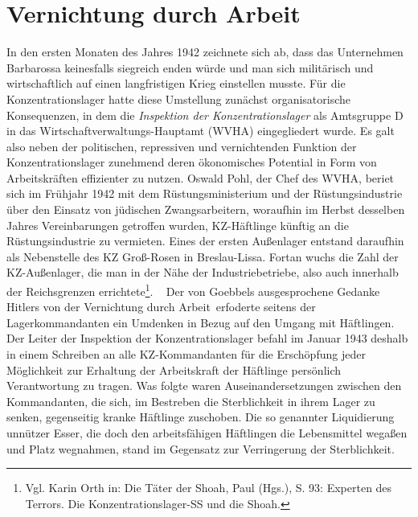 \documentclass[a4paper,12pt,ngerman,
]{nisebook}
\begin{document}
\section{Vernichtung durch Arbeit}
In den ersten Monaten des Jahres 1942 zeichnete sich ab, dass das Unternehmen Barbarossa keinesfalls siegreich enden würde und man sich militärisch und wirtschaftlich auf einen langfristigen Krieg einstellen musste. Für die Konzentrationslager hatte diese Umstellung zunächst organisatorische Konsequenzen, in dem die \emph{Inspektion der Konzentrationslager} als Amtsgruppe D in das Wirtschaftverwaltungs-Hauptamt (WVHA) eingegliedert wurde. Es galt also neben der politischen, repressiven und vernichtenden Funktion der Konzentrationslager zunehmend deren ökonomisches Potential in Form von Arbeitskräften effizienter zu nutzen.
Oswald Pohl, der Chef des WVHA, beriet sich im Frühjahr 1942 mit dem Rüstungsministerium und der Rüstungsindustrie über den Einsatz von jüdischen Zwangsarbeitern, woraufhin im Herbst desselben Jahres Vereinbarungen getroffen wurden, KZ-Häftlinge künftig an die Rüstungsindustrie zu vermieten. Eines der ersten Außenlager  entstand daraufhin als Nebenstelle des KZ Groß-Rosen in Breslau-Lissa. Fortan wuchs die Zahl der KZ-Außenlager, die man in der Nähe der Industriebetriebe, also auch innerhalb der Reichsgrenzen errichtete\footnote{Vgl. Karin Orth in: \glqq Die Täter der Shoah\grqq, Paul (Hgs.), S. 93: \glqq Experten des Terrors. Die Konzentrationslager-SS und die Shoah\grqq.}.
~\newline
Der von Goebbels ausgesprochene Gedanke Hitlers von der \glqq Vernichtung durch Arbeit\grqq~erfoderte seitens der Lagerkommandanten ein Umdenken in Bezug auf den Umgang mit Häftlingen.
Der Leiter der Inspektion der Konzentrationslager befahl im Januar 1943 deshalb in einem Schreiben an alle KZ-Kommandanten \glqq für die Erschöpfung jeder Möglichkeit zur Erhaltung der Arbeitskraft der Häftlinge persönlich Verantwortung zu tragen\grqq. Was folgte waren Auseinandersetzungen zwischen den Kommandanten, die sich, im Bestreben die Sterblichkeit in ihrem Lager zu senken, gegenseitig kranke Häftlinge zuschoben. Die so genannter Liquidierung unnützer Esser, die doch den arbeitsfähigen Häftlingen die Lebensmittel wegaßen und Platz wegnahmen, stand im Gegensatz zur Verringerung der Sterblichkeit.
\end{document}
